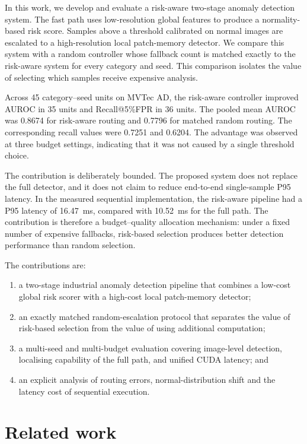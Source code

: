 \documentclass[preprint,12pt]{elsarticle}
\begin{document}
In this work, we develop and evaluate a risk-aware two-stage anomaly detection system. The fast path uses low-resolution global features to produce a normality-based risk score. Samples above a threshold calibrated on normal images are escalated to a high-resolution local patch-memory detector. We compare this system with a random controller whose fallback count is matched exactly to the risk-aware system for every category and seed. This comparison isolates the value of selecting which samples receive expensive analysis.

Across 45 category--seed units on MVTec AD, the risk-aware controller improved AUROC in 35 units and Recall@5\%FPR in 36 units. The pooled mean AUROC was 0.8674 for risk-aware routing and 0.7796 for matched random routing. The corresponding recall values were 0.7251 and 0.6204. The advantage was observed at three budget settings, indicating that it was not caused by a single threshold choice.

The contribution is deliberately bounded. The proposed system does not replace the full detector, and it does not claim to reduce end-to-end single-sample P95 latency. In the measured sequential implementation, the risk-aware pipeline had a P95 latency of 16.47~ms, compared with 10.52~ms for the full path. The contribution is therefore a budget--quality allocation mechanism: under a fixed number of expensive fallbacks, risk-based selection produces better detection performance than random selection.

The contributions are:
\begin{enumerate}
\item a two-stage industrial anomaly detection pipeline that combines a low-cost global risk scorer with a high-cost local patch-memory detector;
\item an exactly matched random-escalation protocol that separates the value of risk-based selection from the value of using additional computation;
\item a multi-seed and multi-budget evaluation covering image-level detection, localising capability of the full path, and unified CUDA latency; and
\item an explicit analysis of routing errors, normal-distribution shift and the latency cost of sequential execution.
\end{enumerate}

\section{Related work}
\end{document}
